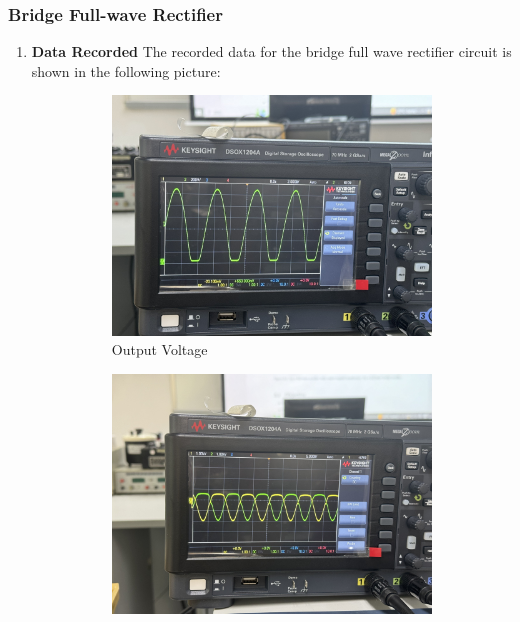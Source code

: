     \subsubsection{Bridge Full-wave Rectifier}
    \begin{enumerate}[I]
        \item \textbf{Data Recorded}\newline
            The recorded data for the bridge full wave rectifier circuit is shown in the following picture:
            \begin{figure}[H]
                \centering
                \begin{subfigure}{0.4\textwidth}
                    \centering
                    \includegraphics[width=1\textwidth]{Experiment_03/Images/3.5_outPutVoltage.jpg}
                    \caption{Output Voltage}
                    \label{wave:3.5OV}
                \end{subfigure}
                \begin{subfigure}{0.4\textwidth}
                    \centering
                    \includegraphics[width=1\textwidth]{Experiment_03/Images/3.5_diodeVoltage.jpg}

\end{subfigure}
\end{figure}
\end{enumerate}
